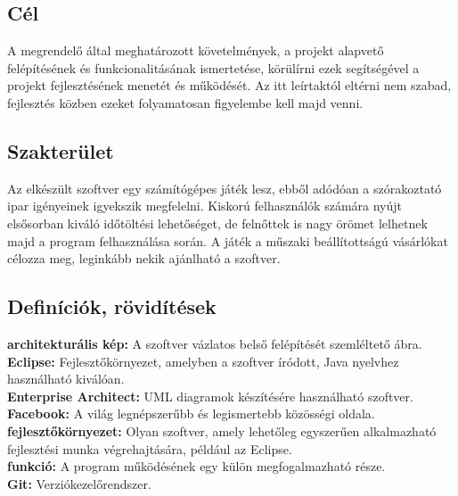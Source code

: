 
\subsection{Cél}
A megrendelő által meghatározott követelmények, a projekt alapvető felépítésének és funkcionalitásának ismertetése, körülírni ezek segítségével a projekt fejlesztésének menetét és működését. Az itt leírtaktól eltérni nem szabad, fejlesztés közben ezeket folyamatosan figyelembe kell majd venni.

\subsection{Szakterület}

Az elkészült szoftver egy számítógépes játék lesz, ebből adódóan a szórakoztató ipar igényeinek igyekszik megfelelni. Kiskorú felhasználók számára nyújt elsősorban kiváló időtöltési lehetőséget, de felnőttek is nagy örömet lelhetnek majd a program felhasználása során. A játék a műszaki beállítottságú vásárlókat célozza meg, leginkább nekik ajánlható a szoftver.

\subsection{Definíciók, rövidítések}


\noindent \textbf{architekturális kép:} A szoftver vázlatos belső felépítését szemléltető ábra.\\

\noindent\textbf{Eclipse:} Fejlesztőkörnyezet, amelyben a szoftver íródott, Java nyelvhez használható kiválóan.\\

\noindent\textbf{Enterprise Architect:} UML diagramok készítésére használható szoftver.\\

\noindent\textbf{Facebook:} A világ legnépszerűbb és legismertebb közösségi oldala.\\

\noindent\textbf{fejlesztőkörnyezet:} Olyan szoftver, amely lehetőleg egyszerűen alkalmazható fejlesztési munka végrehajtására, például az Eclipse.\\

\noindent\textbf{funkció:} A program működésének egy külön megfogalmazható része.\\

\noindent\textbf{Git:} Verziókezelőrendszer.\\

